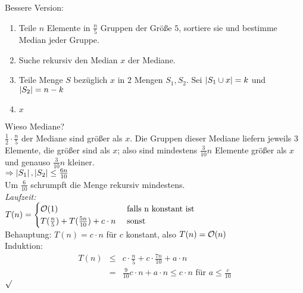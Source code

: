        Bessere Version:
        \begin{enumerate}
            \item Teile $n$ Elemente in $\frac{n}{5}$ Gruppen der Größe $5$, sortiere sie und bestimme Median jeder Gruppe.
            \item Suche rekursiv den Median $x$ der Mediane.
            \item Teile Menge $S$ bezüglich $x$ in 2 Mengen $S_1, S_2$. Sei $\left| S_1 \cup x \right| = k$ und $\left| S_2 \right| = n-k$
            \item 
            \begin{algorithmic}
				\begin{algorithm}
				\State \Return $x$
				\Else 
				\State {}
				\Else
				\State {}
				\EndIf
				\EndIf
				\end{algorithm}
            \end{algorithmic}
        \end{enumerate}
        Wieso Mediane? \\
        $\frac{1}{2} \cdot \frac{n}{5}$ der Mediane sind größer als $x$. Die Gruppen dieser Mediane liefern jeweils $3$ Elemente, die größer sind als $x$; also sind 
        mindestens $\frac{3}{10} n $ Elemente größer als $x$ und genauso $\frac{3}{10}n$ kleiner. \\
        $\Ra \btl S_1 \btr, \btl S_2 \btr \leq \frac{6n}{10}$ \\
        Um $\frac{6}{10}$ schrumpft die Menge rekursiv mindestens. \\
        \emph{Laufzeit:} \\
        $T(n) = \begin{cases} 
        \mathcal{O}(1) & \text{ falls n konstant ist} \\
        T(\frac{n}{5}) + T(\frac{5n}{10}) + c \cdot n & \text{ sonst}
        \end{cases}$ \\
        Behauptung: $T(n)  = c \cdot n$ für $c$ konstant, also $T(n) = \mathcal{O}(n)$ \\    
        Induktion: 
        \begin{eqnarray*}
            T(n) & \leq & c \cdot \frac{n}{5} + c \cdot \frac{7n}{10} + a \cdot n \\
            &=& \frac{9}{10} c \cdot n + a \cdot n \leq c \cdot n \text { für } a \leq \frac{c}{10}
        \end{eqnarray*} $\surd$

